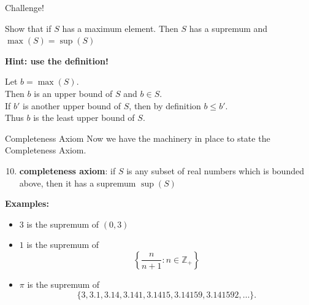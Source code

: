 \documentclass{beamer}
\begin{document}
\begin{frame}{Challenge!}
\begin{prob}
Show that if $S$ has a maximum element.  Then $S$ has a supremum and $\max(S)=\sup(S)$
\end{prob}
\pause
\textbf{Hint: use the definition!}
\pause
\begin{soln}
Let $b=\max(S)$.\\
\pause
Then $b$ is an upper bound of $S$ and $b\in S$.\\
\pause
If $b'$ is another upper bound of $S$, then by definition $b\leq b'$.\\
\pause
Thus $b$ is the least upper bound of $S$.
\end{soln}
\end{frame}

\begin{frame}{Completeness Axiom}
Now we have the machinery in place to state the Completeness Axiom.
\pause
\begin{enumerate}[\text{A}1]
\setcounter{enumi}{9}
\pause
\item \textbf{completeness axiom}: if $S$ is any subset of real numbers which is bounded above, then it has a supremum $\sup(S)$
\end{enumerate}
\pause
\textbf{Examples:}
\begin{itemize}
\pause
\item $3$ is the supremum of $(0,3)$
\pause
\item $1$ is the supremum of
$$\left\lbrace
\frac{n}{n+1}: n\in\mathbb{Z}_+
\right\rbrace$$
\pause
\item $\pi$ is the supremum of
$$\{3,3.1,3.14,3.141,3.1415,3.14159,3.141592,\dots\}.$$
\end{itemize}
\end{frame}
\end{document}
